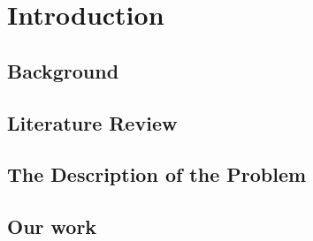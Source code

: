 \section{Introduction}


\subsection{Background}




\subsection{Literature Review}




\subsection{The Description of the Problem}





\subsection{Our work}



